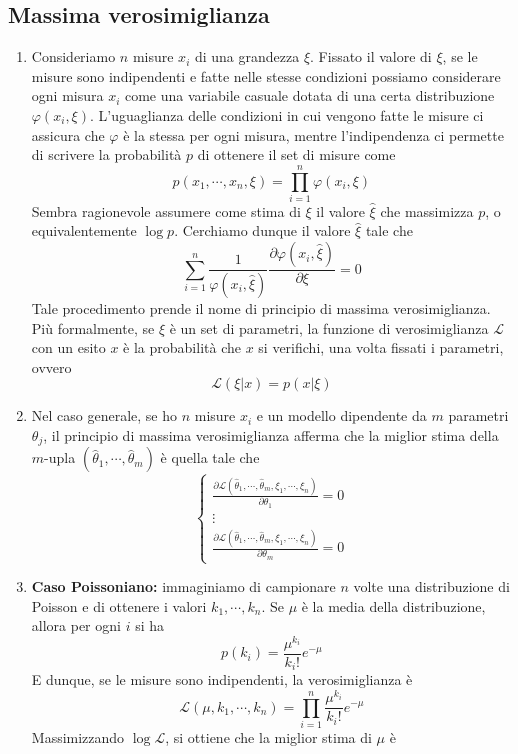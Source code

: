 \documentclass[a4paper,11pt]{article}
\begin{document}
\subsection{Massima verosimiglianza}
\begin{enumerate}[resume]
	\item Consideriamo $n$ misure $x_i$ di una grandezza $\xi$. Fissato il valore di $\xi$, se le misure sono indipendenti e fatte nelle stesse condizioni possiamo considerare ogni misura $x_i$ come una variabile casuale dotata di una certa distribuzione $\varphi(x_i,\xi)$. L'uguaglianza delle condizioni in cui vengono fatte le misure ci assicura che $\varphi$ è la stessa per ogni misura, mentre l'indipendenza ci permette di scrivere la probabilità $p$ di ottenere il set di misure come
	\[p(x_1,\cdots,x_n,\xi)=\prod_{i=1}^{n}\varphi(x_i,\xi)\]
	Sembra ragionevole assumere come stima di $\xi$ il valore $\hat{\xi}$ che massimizza $p$, o equivalentemente $\log p$. Cerchiamo dunque il valore $\hat{\xi}$ tale che
	\[\sum_{i=1}^{n}\frac{1}{\varphi(x_i,\hat\xi)}\frac{\partial \varphi(x_i,\hat{\xi})}{\partial \xi}=0\]
	Tale procedimento prende il nome di principio di massima verosimiglianza. Più formalmente, se $\xi$ è un set di parametri, la funzione di verosimiglianza $\mathcal{L}$ con un esito $x$ è la probabilità che $x$ si verifichi, una volta fissati i parametri, ovvero
	\[\mathcal{L}(\xi|x)=p(x|\xi)\]
	\item Nel caso generale, se ho $n$ misure $x_i$ e un modello dipendente da $m$ parametri $\theta_j$, il principio di massima verosimiglianza afferma che la miglior stima della $m$-upla $(\hat\theta_1,\cdots,\hat\theta_m)$ è quella tale che
	\[\left\{\begin{array}{l}
	\frac{\partial\mathcal{L}(\hat\theta_1,\cdots,\hat\theta_m,\xi_1,\cdots,\xi_n)}{\partial\theta_1}=0\\
	\vdots\\
	\frac{\partial\mathcal{L}(\hat\theta_1,\cdots,\hat\theta_m,\xi_1,\cdots,\xi_n)}{\partial\theta_m}=0
	\end{array}\right.\]
	\item\textbf{Caso Poissoniano:} immaginiamo di campionare $n$ volte una distribuzione di Poisson e di ottenere i valori $k_1,\cdots,k_n$. Se $\mu$ è la media della distribuzione, allora per ogni $i$ si ha
	\[p(k_i)=\frac{\mu^{k_i}}{k_i!}e^{-\mu}\]
	E dunque, se le misure sono indipendenti, la verosimiglianza è
	\[\mathcal{L}(\mu,k_1,\cdots,k_n)=\prod_{i=1}^{n}\frac{\mu^{k_i}}{k_i!}e^{-\mu}\]
	Massimizzando $\log\mathcal{L}$, si ottiene che la miglior stima di $\mu$ è

\end{enumerate}
\end{document}
